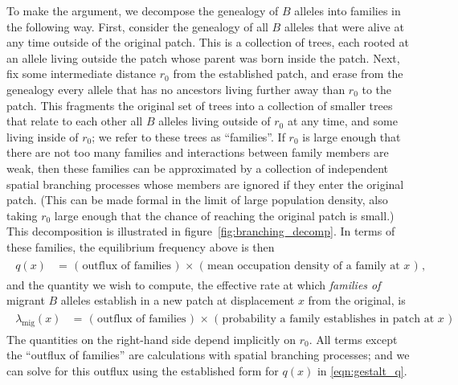 \documentclass{article}
\newcommand{\migrate}{\lambda_\text{mig}}
\begin{document}
To make the argument, we decompose the genealogy of $B$ alleles into families in the following way.
First, consider the genealogy of all $B$ alleles that were alive at any time outside of the original patch.  
This is a collection of trees, each rooted at an allele living outside the patch whose parent was born inside the patch.
Next, fix some intermediate distance $r_0$ from the established patch,
and erase from the genealogy every allele that has no ancestors living further away than $r_0$ to the patch.
This fragments the original set of trees into a collection of smaller trees that relate to each other all $B$ alleles living outside of $r_0$ at any time,
and some living inside of $r_0$;
we refer to these trees as ``families''.
If $r_0$ is large enough that there are not too many families
and interactions between family members are weak,
then these families can be approximated 
by a collection of independent spatial branching processes
whose members are ignored if they enter the original patch.
(This can be made formal in the limit of large population density, also taking $r_0$ large enough that the chance of reaching the original patch is small.)
This decomposition is illustrated in figure~\ref{fig:branching_decomp}.
In terms of these families, the equilibrium frequency above is then
\begin{align}
    \label{eqn:gestalt_q}
    \begin{split}
        q(x) &= \text{ ( outflux of families ) } \times \text{ ( mean occupation density of a family at $x$ ) } ,
\end{split}
\end{align}
and the quantity we wish to compute,
the effective rate at which \emph{families of} migrant $B$ alleles establish in a new patch at displacement $x$ from the original,
is
\begin{align}
    \label{eqn:gestalt_migrate}
    \begin{split}
        \migrate(x) &= \text{ ( outflux of families ) } \times \text{ ( probability a family establishes in patch at $x$ ) }
    \end{split}
\end{align}
The quantities on the right-hand side depend implicitly on $r_0$.
All terms except the ``outflux of families'' are calculations with spatial branching processes;
and we can solve for this outflux using the established form for $q(x)$ in \eqref{eqn:gestalt_q}.
\end{document}
